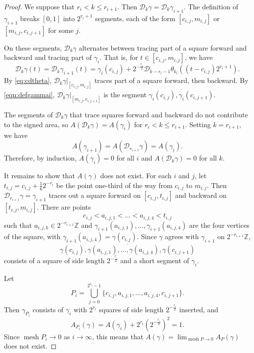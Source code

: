 \documentclass[12pt,reqno]{amsart}
\newcommand{\cD}{\mathcal{D}}
\DeclareMathOperator{\mesh}{mesh}
\newcommand{\Z}{\mathbb{Z}}
\theoremstyle{remark}
\newcommand{\0}{\mathbf{0}}
\renewcommand{\1}{\mathbf 1}
\begin{document}
\begin{proof}
  We suppose that $r_i < k \le r_{i+1}$. Then $\cD_k \gamma = \cD_{k} \gamma_{i+1}$. The definition of $\gamma_{i+1}$ breaks $[0,1]$ into $2^{r_i + 1}$ segments, each of the form $[c_{i,j}, m_{i,j}]$ or $[m_{i,j}, c_{i,j+1}]$ for some $j$.

  On these segments, $\cD_{k}\gamma$ alternates between tracing part of a square forward and backward and tracing part of $\gamma_i$.
  That is, for $t\in [c_{i,j}, m_{i,j}]$, we have
  \begin{equation}\label{eq:dkgamma-formula}
    \cD_{k}\gamma(t) = \cD_{k}\gamma_{i+1}(t) = \gamma_i(c_{i,j}) + 2^{-\frac{r_i}{2}} \cD_{k - r_i - 1}\theta_{k_i}((t-c_{i,j}) 2^{r_i + 1}).
  \end{equation}
  By \eqref{eq:cdtheta}, $\cD_k\gamma|_{[c_{i,j}, m_{i,j}]}$ traces part of a square forward, then backward. By \eqref{eqn:defgammai}, $\cD_k\gamma|_{[m_{i,j}, c_{i,j+1}]}$ is the segment $\overline{\gamma_i(c_{i,j}), \gamma_i(c_{i,j+1})}$.

  The segments of $\cD_k\gamma$ that trace squares forward and backward do not contribute to the signed area, so $A(\cD_{k}\gamma) = A(\gamma_{i})$ for $r_i < k \le r_{i+1}$. Setting $k=r_{i+1}$, we have
  $$A(\gamma_{i+1}) = A(\cD_{r_{i+1}}\gamma) = A(\gamma_i).$$
  Therefore, by induction, $A(\gamma_i) = 0$ for all $i$ and $A(\cD_{k}\gamma) = 0$ for all $k$.

  It remains to show that $A(\gamma)$ does not exist. For each $i$ and $j$, let $t_{i,j} = c_{i,j} + \frac{1}{6} 2^{-r_i}$ be the point one-third of the way from $c_{i,j}$ to $m_{i,j}$. Then $\cD_{r_{i+1}} \gamma = \gamma_{i+1}$ traces out a square forward on $[c_{i,j}, t_{i,j}]$ and backward on $[t_{i,j}, m_{i,j}]$. There are points
  $$c_{i,j} < a_{i,j,1} < \dots < a_{i,j,4} < t_{i,j}$$
  such that $a_{i,j,k} \in 2^{-r_{i+1}} \Z$ and $\gamma_{i+1}(a_{i,j,1}), \dots, \gamma_{i+1}(a_{i,j,4})$ are the four vertices of the square, with $\gamma_{i+1}(a_{i,j,4}) = \gamma(c_{i,j})$. Since $\gamma$ agrees with $\gamma_{i+1}$ on $2^{-r_{i+1}} \Z$,
  $$\overline{\gamma(c_{i,j}), \gamma(a_{i,j,1}), \dots, \gamma(a_{i,j,4}), \gamma(c_{i,j+1})}$$
  consists of a square of side length $2^{-\frac{r_i}{2}}$ and a short segment of $\gamma_i$.

  Let
  $$P_i = \bigcup_{j=0}^{2^{r_i}-1} \{c_{i,j}, a_{i,j,1}, \dots, a_{i,j,4},c_{i,j+1}\}.$$
  Then $\gamma_{P_i}$ consists of $\gamma_i$ with $2^{r_i}$ squares of side length $2^{-\frac{r_i}{2}}$ inserted, and
  $$A_{P_i}(\gamma) = A(\gamma_i) + 2^{r_i} (2^{-\frac{r_i}{2}})^2 = 1.$$
  Since $\mesh P_i \to 0$ as $i\to \infty$, this means that $A(\gamma) = \lim_{\mesh P\to 0} A_P(\gamma)$ does not exist.


\end{proof}
\end{document}
